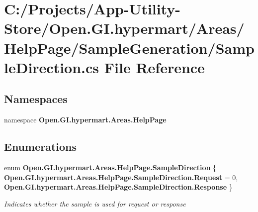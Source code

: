 \section{C\+:/\+Projects/\+App-\/\+Utility-\/\+Store/\+Open.G\+I.\+hypermart/\+Areas/\+Help\+Page/\+Sample\+Generation/\+Sample\+Direction.cs File Reference}
\label{_sample_direction_8cs}
\subsection*{Namespaces}
\begin{DoxyCompactItemize}
\item 
namespace \textbf{ Open.\+G\+I.\+hypermart.\+Areas.\+Help\+Page}
\end{DoxyCompactItemize}
\subsection*{Enumerations}
\begin{DoxyCompactItemize}
\item 
enum \textbf{ Open.\+G\+I.\+hypermart.\+Areas.\+Help\+Page.\+Sample\+Direction} \{ \textbf{ Open.\+G\+I.\+hypermart.\+Areas.\+Help\+Page.\+Sample\+Direction.\+Request} = 0, 
\textbf{ Open.\+G\+I.\+hypermart.\+Areas.\+Help\+Page.\+Sample\+Direction.\+Response}
 \}\begin{DoxyCompactList}\small\item\em Indicates whether the sample is used for request or response \end{DoxyCompactList}
\end{DoxyCompactItemize}
